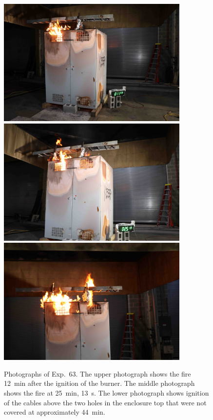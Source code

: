 \begin{figure}[p]
\centering
\includegraphics[height=2.50in]{../FIGURES/Test_63_11_min_59_s} \\ \vspace{0.1in}
\includegraphics[height=2.50in]{../FIGURES/Test_63_25_min_13_s} \\ \vspace{0.1in}
\includegraphics[height=2.50in]{../FIGURES/Test_63_ignition}
\caption[Photographs of Exp.~63]{Photographs of Exp.~63. The upper photograph shows the fire 12~min after the ignition of the burner. The middle photograph shows the fire at 25~min, 13~s. The lower photograph shows ignition of the cables above the two holes in the enclosure top that were not covered at approximately 44~min.}
\label{fig:Test_63_photos}
\end{figure}


